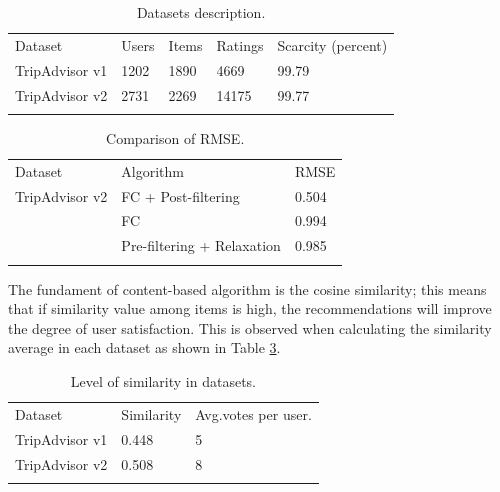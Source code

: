 \begin{table}
\centering
\caption{Datasets description.}
\label{tab:3}       %
\begin{tabular}{lllll}
\hline\noalign{\smallskip}
Dataset & Users & Items & Ratings & Scarcity (percent) \\
\noalign{\smallskip}\hline\noalign{\smallskip}
TripAdvisor v1 & 1202 & 1890 & 4669 & 99.79 \\
TripAdvisor v2 & 2731 & 2269 & 14175 & 99.77 \\
\noalign{\smallskip}\hline
\end{tabular}
\end{table}




\begin{table}
\centering
\caption{Comparison of RMSE.}
\label{tab:4}       %
\begin{tabular}{lll}
\hline\noalign{\smallskip}
Dataset & Algorithm & RMSE \\
\noalign{\smallskip}\hline\noalign{\smallskip}
TripAdvisor v2 & FC + Post-filtering  & 0.504  \\
               & FC          & 0.994  \\
               & Pre-filtering + Relaxation & 0.985  \\

\noalign{\smallskip}\hline
\end{tabular}
\end{table}


The fundament of content-based algorithm is the cosine similarity; this means that if similarity value among items is high, the recommendations will improve the degree of user satisfaction. This is observed when calculating the similarity average in each dataset as shown in Table \ref{tab:5}.

\begin{table}
\centering
\caption{Level of similarity in datasets. }
\label{tab:5}       %
\begin{tabular}{lll}
\hline\noalign{\smallskip}
Dataset  & Similarity  & Avg.votes per user. \\
\noalign{\smallskip}\hline\noalign{\smallskip}
TripAdvisor v1 & 0.448  & 5  \\
TripAdvisor v2 & 0.508  & 8  \\

\noalign{\smallskip}\hline
\end{tabular}
\end{table}


